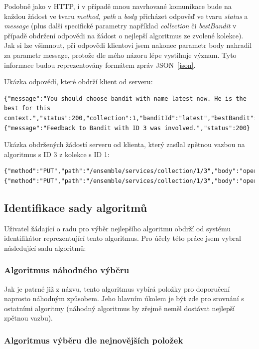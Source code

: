\documentclass[thesis=M,czech]{FITthesis}[2014/05/07]
\begin{document}
Podobně jako v HTTP, i v případě mnou navrhované komunikace bude na každou žádost ve tvaru \emph{method, path} a \emph{body} přicházet odpověď ve tvaru \emph{status} a \emph{message} (plus další specifické parametry například \emph{collection} či \emph{bestBandit} v případě obdržení odpovědi na žádost o nejlepší algoritmus ze zvolené kolekce). Jak si lze všimnout, při odpovědi klientovi jsem nakonec parametr body nahradil za parametr message, protože dle mého názoru lépe vystihuje význam. Tyto informace budou reprezentovány formátem zpráv JSON~\ref{json}.

Ukázka odpovědí, které obdrží klient od serveru:

\begin{lstlisting}
{"message":"You should choose bandit with name latest now. He is the best for this context.","status":200,"collection":1,"banditId":"latest","bestBandit":3}
{"message":"Feedback to Bandit with ID 3 was involved.","status":200}
\end{lstlisting}

Ukázka obdržených žádostí serveru od klienta, který zasílal zpětnou vazbou na algoritmus s ID 3 z kolekce s ID 1:

\begin{lstlisting}
{"method":"PUT","path":"/ensemble/services/collection/1/3","body":"operation=use"}
{"method":"PUT","path":"/ensemble/services/collection/1/3","body":"operation=feedback&feedbackType=possitive"}
\end{lstlisting}
			
\subsection{Identifikace sady algoritmů}
Uživatel žádající o radu pro výběr nejlepšího algoritmu obdrží od systému identifikátor reprezentující tento algoritmus. Pro účely této práce jsem vybral následující sadu algoritmů:

\subsubsection{Algoritmus náhodného výběru}

Jak je patrné již z názvu, tento algoritmus vybírá položky pro doporučení naprosto náhodným způsobem. Jeho hlavním úkolem je být zde pro srovnání s ostatními algoritmy (náhodný algoritmus by zřejmě neměl dostávat nejlepší zpětnou vazbu). 

\subsubsection{Algoritmus výběru dle nejnovějších položek}
\end{document}
